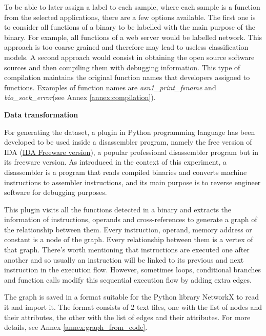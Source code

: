 To be able to later assign a label to each sample, where each sample is a function from the selected applications, there are a few options available. The first one is to consider all functions of a binary to be labelled with the main purpose of the binary. For example, all functions of a web server would be labelled network. This approach is too coarse grained and therefore may lead to useless classification models. A second approach would consist in obtaining the open source software sources and then compiling them with debugging information. This type of compilation maintains the original function names that developers assigned to functions. Examples of function names are \textit{asn1\_print\_fsname} and \textit{bio\_sock\_error}(see Annex \ref{annex:compilation}).



\textbf{Data transformation}

For generating the dataset, a plugin in Python programming language has been developed to be used inside a disassembler program, namely the free version of IDA (\href{https://www.hex-rays.com/products/ida/support/download\_freeware.shtml}{IDA Freeware version}), a popular professional disassembler program but in its freeware version. As introduced in the context of this experiment, a disassembler is a program that reads compiled binaries and converts machine instructions to assembler instructions, and its main purpose is to reverse engineer software for debugging purposes.


This plugin visits all the functions detected in a binary and extracts the information of instructions, operands and cross-references to generate a graph of the relationship between them. Every instruction, operand, memory address or constant is a node of the graph. Every relationship between them is a vertex of that graph. There's worth mentioning that instructions are executed one after another and so usually an instruction will be linked to its previous and next instruction in the execution flow. However, sometimes loops, conditional branches and function calls modify this sequential execution flow by adding extra edges.

The graph is saved in a format suitable for the Python library NetworkX to read it and import it. The format consists of 2 text files, one with the list of nodes and their attributes, the other with the list of edges and their attributes. For more details, see Annex \ref{annex:graph_from_code}.




